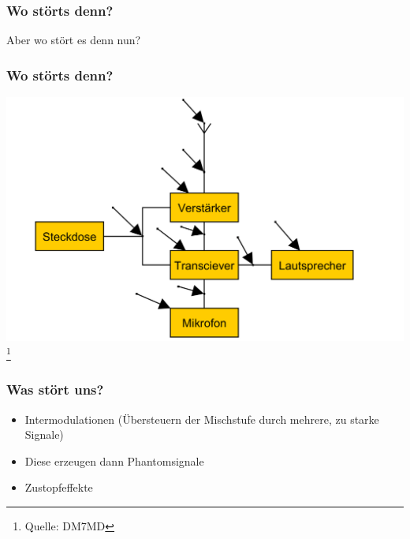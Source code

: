 \begin{frame}
	\frametitle{Wo störts denn?}
	\Large{Aber wo stört es denn nun?}
\end{frame}

\begin{frame}
 	\frametitle{Wo störts denn?}
 	\includegraphics[width=1\textwidth,height=.8\textheight,keepaspectratio]{e18/Stoerungen.png}
 	\footnote{\tiny Quelle: DM7MD} 	
\end{frame}

\begin{frame}
	\frametitle{Was stört uns?}
	\begin{itemize}
		\item Intermodulationen (Übersteuern der Mischstufe durch mehrere, zu starke Signale)
		\item Diese erzeugen dann Phantomsignale
		\item Zustopfeffekte 
	\end{itemize}
\end{frame}

